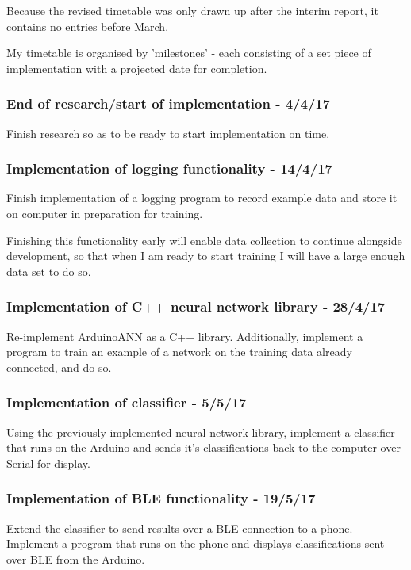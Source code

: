 \documentclass[a4paper]{article}
\begin{document}
Because the revised timetable was only drawn up after the interim report, it contains no entries before March.

My timetable is organised by 'milestones' - each consisting of a set piece of implementation with a projected date for completion.

\small
\subsubsection{End of research/start of implementation - 4/4/17}

Finish research so as to be ready to start implementation on time.

\subsubsection{Implementation of logging functionality - 14/4/17}

Finish implementation of a logging program to record example data and store it on computer in preparation for training.

Finishing this functionality early will enable data collection to continue alongside development, so that when I am ready to start training I will have a large enough data set to do so.

\subsubsection{Implementation of C++ neural network library - 28/4/17}

Re-implement ArduinoANN as a C++ library. Additionally, implement a program to train an example of a network on the training data already connected, and do so.

\subsubsection{Implementation of classifier - 5/5/17}

Using the previously implemented neural network library, implement a classifier that runs on the Arduino and sends it's classifications back to the computer over Serial for display.

\subsubsection{Implementation of BLE functionality - 19/5/17}

Extend the classifier to send results over a BLE connection to a phone. Implement a program that runs on the phone and displays classifications sent over BLE from the Arduino.
\end{document}
